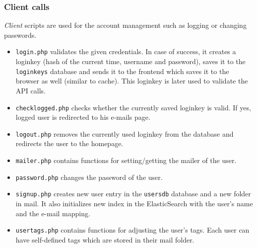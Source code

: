 \subsubsection{Client calls}
\emph{Client} scripts are used for the account management such as logging or changing passwords.
\begin{itemize}
\item \texttt{login.php} validates the given credentials. In case of success, it creates a loginkey (hash of the current time, username and password), saves it to the \texttt{loginkeys} database and sends it to the frontend which saves it to the browser as well (similar to cache). This loginkey is later used to validate the API calls.
\item \texttt{checklogged.php} checks whether the currently saved loginkey is valid. If yes, logged user is redirected to his e-mails page.
\item \texttt{logout.php} removes the currently used loginkey from the database and redirects the user to the homepage.
\item \texttt{mailer.php} contains functions for setting/getting the mailer of the user.
\item \texttt{password.php} changes the password of the user.
\item \texttt{signup.php} creates new user entry in the \texttt{usersdb} database and a new folder in mail. It also initializes new index in the ElasticSearch with the user's name and the e-mail mapping.
\item \texttt{usertags.php} contains functions for adjusting the user's tags. Each user can have self-defined tags which are stored in their mail folder.
\label{userapi}
\end{itemize}

